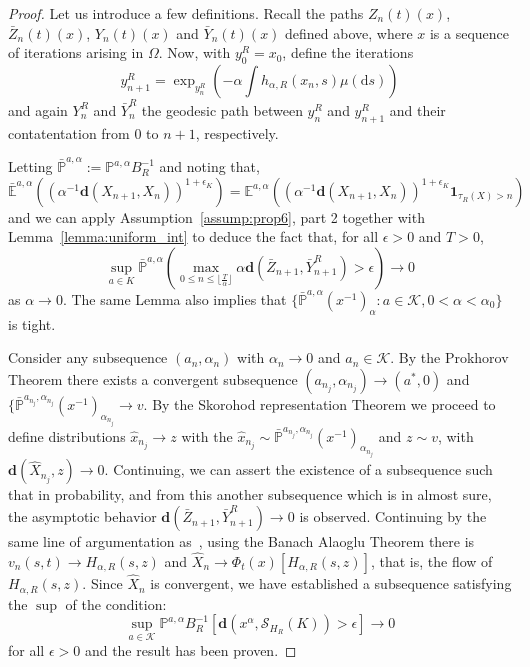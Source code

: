 \documentclass{article}
\newcommand{\CK}{\mathcal{K}}
\newcommand{\rd}{\mathrm{d}}
\newcommand{\bd}{\mathbf{d}}
\begin{document}
\begin{proof}


    
    Let us introduce a few definitions. Recall the paths $Z_n(t)(x)$, $\bar{Z}_n(t)(x)$, $Y_n(t)(x)$ and $\bar{Y}_n(t)(x)$ defined above, where $x$ is a sequence of iterations arising in $\Omega$. Now, with $y^R_0=x_0$, define the iterations \begin{equation}
     y^R_{n+1} = \exp_{y^R_n}\left(-\alpha \int h_{\alpha,R}(x_n,s)\mu(\rd s)\right) 
    \end{equation}
    and again $Y^R_n$ and $\bar{Y}^R_n$ the geodesic path between $y^R_n$ and $y^R_{n+1}$ and their contatentation from $0$ to $n+1$, respectively.

  
    Letting $\bar{\mathbb{P}}^{a,\alpha}:=\mathbb{P}^{a,\alpha} B_R^{-1}$ and noting that,
    \[
    \bar{\mathbb{E}}^{a,\alpha}\left(\left(\alpha^{-1}\bd(X_{n+1},X_n)\right)^{1+\epsilon_K}\right) = \mathbb{E}^{a,\alpha}\left(\left(\alpha^{-1}\bd(X_{n+1},X_n)\right)^{1+\epsilon_K} \mathbf{1}_{\tau_R(X)>n}\right)
    \]
    and we can apply Assumption~\ref{assump:prop6}, part 2 together with Lemma~\ref{lemma:uniform_int} to deduce the fact that, for all $\epsilon>0$ and $T>0$,
    \[
    \sup\limits_{a\in K}\bar{\mathbb{P}}^{a,\alpha}\left(\max\limits_{0\le n\le \lfloor \frac{T}{\alpha}\rfloor} \alpha \bd(\bar{Z}_{n+1},\bar{Y}^R_{n+1})>\epsilon\right) \to 0
    \]
    as $\alpha\to 0$. The same Lemma also implies that $\{\bar{\mathbb{P}}^{a,\alpha} (x^{-1})_{
    \alpha}:a\in\mathcal{K},0<\alpha<\alpha_0\}$ is tight. 

    Consider any subsequence $(a_n,\alpha_n)$ with $\alpha_n\to 0$ and $a_n\in \mathcal{K}$. By the Prokhorov Theorem there exists a convergent subsequence $(a_{n_j},\alpha_{n_j})
    \to (a^*,0)$ and $\{\bar{\mathbb{P}}^{a_{n_j},\alpha_{n_j}} (x^{-1})_{\alpha_{n_j}}\to v$. By the Skorohod representation Theorem we proceed to define distributions $\hat{x}_{n_j}\to z$ with the $\hat{x}_{n_j}\sim \bar{\mathbb{P}}^{a_{n_j},\alpha_{n_j}}  (x^{-1})_{\alpha_{n_j}}$ and $z\sim v$, with $\bd(\hat{X}_{n_j},z)\to 0$. Continuing, we can assert the existence of a subsequence such that in probability, and from this another subsequence which is in almost sure, the asymptotic behavior $\bd(\bar{Z}_{n+1},\bar{Y}^R_{n+1})\to 0$ is observed. Continuing by the same line of argumentation as~\cite{bianchi2019constant}, using the Banach Alaoglu Theorem there is $v_n(s,t)\to H_{\alpha,R}(s,z)$ and $\hat{X}_{n}\to \Phi_t(x)[H_{\alpha,R}(s,z)]$, that is, the flow of $H_{\alpha,R}(s,z)$. Since $\hat{X}_n$ is convergent, we have established a subsequence satisfying the $\sup$ of the condition:
        \[
\sup\limits_{a\in \CK} \mathbb{P}^{a,\alpha} B^{-1}_R [\bd(x^{\alpha},\mathcal{S}_{H_R}(K))>\epsilon] \to 0
    \]
    for all $\epsilon>0$ and the result has been proven.

    
\end{proof}
\end{document}
